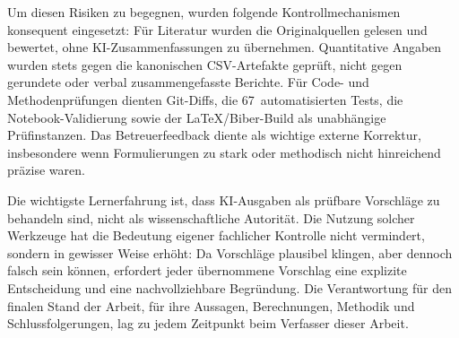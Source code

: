 Um diesen Risiken zu begegnen, wurden folgende Kontrollmechanismen konsequent eingesetzt: Für Literatur wurden die Originalquellen gelesen und bewertet, ohne
KI-Zusammenfassungen zu übernehmen. Quantitative Angaben wurden stets gegen
die kanonischen CSV-Artefakte geprüft, nicht gegen gerundete oder verbal
zusammengefasste Berichte. Für Code- und Methodenprüfungen dienten Git-Diffs,
die 67~automatisierten Tests, die Notebook-Validierung sowie der \LaTeX{}/Biber-Build als
unabhängige Prüfinstanzen. Das Betreuerfeedback diente als wichtige externe
Korrektur, insbesondere wenn Formulierungen zu stark oder methodisch nicht
hinreichend präzise waren.

Die wichtigste Lernerfahrung ist, dass KI-Ausgaben als prüfbare Vorschläge zu
behandeln sind, nicht als wissenschaftliche Autorität. Die Nutzung solcher
Werkzeuge hat die Bedeutung eigener fachlicher Kontrolle nicht vermindert,
sondern in gewisser Weise erhöht: Da Vorschläge plausibel klingen, aber dennoch
falsch sein können, erfordert jeder übernommene Vorschlag eine explizite
Entscheidung und eine nachvollziehbare Begründung. Die Verantwortung für den
finalen Stand der Arbeit, für ihre Aussagen, Berechnungen, Methodik und
Schlussfolgerungen, lag zu jedem Zeitpunkt beim Verfasser dieser Arbeit.
